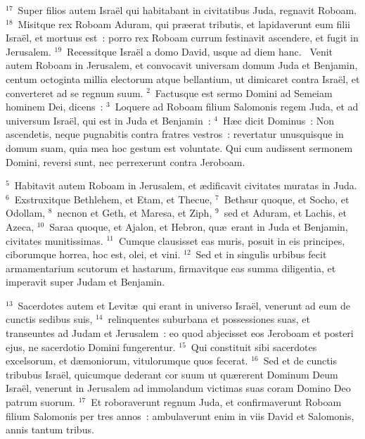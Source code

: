 ${}^{17}$~Super filios autem Isra\"el qui habitabant in civitatibus Juda, regnavit Roboam.
${}^{18}$~Misitque rex Roboam Aduram, qui pr\ae erat tributis, et lapidaverunt eum filii Isra\"el, et mortuus est~: porro rex Roboam currum festinavit ascendere, et fugit in Jerusalem.
${}^{19}$~Recessitque Isra\"el a domo David, usque ad diem hanc.
~\lettrine[lines=10,image=true,loversize=0.05,lraise=-0.03]{V}{}enit autem Roboam in Jerusalem, et convocavit universam domum Juda et Benjamin, centum octoginta millia electorum atque bellantium, ut dimicaret contra Isra\"el, et converteret ad se regnum suum.
${}^{2}$~Factusque est sermo Domini ad Semeiam hominem Dei, dicens~:
${}^{3}$~Loquere ad Roboam filium Salomonis regem Juda, et ad universum Isra\"el, qui est in Juda et Benjamin~:
${}^{4}$~H\ae c dicit Dominus~: Non ascendetis, neque pugnabitis contra fratres vestros~: revertatur unusquisque in domum suam, quia mea hoc gestum est voluntate. Qui cum audissent sermonem Domini, reversi sunt, nec perrexerunt contra Jeroboam.


${}^{5}$~Habitavit autem Roboam in Jerusalem, et \ae dificavit civitates muratas in Juda.
${}^{6}$~Exstruxitque Bethlehem, et Etam, et Thecue,
${}^{7}$~Bethsur quoque, et Socho, et Odollam,
${}^{8}$~necnon et Geth, et Maresa, et Ziph,
${}^{9}$~sed et Aduram, et Lachis, et Azeca,
${}^{10}$~Saraa quoque, et Ajalon, et Hebron, qu\ae\ erant in Juda et Benjamin, civitates munitissimas.
${}^{11}$~Cumque clausisset eas muris, posuit in eis principes, ciborumque horrea, hoc est, olei, et vini.
${}^{12}$~Sed et in singulis urbibus fecit armamentarium scutorum et hastarum, firmavitque eas summa diligentia, et imperavit super Judam et Benjamin.


${}^{13}$~Sacerdotes autem et Levit\ae\ qui erant in universo Isra\"el, venerunt ad eum de cunctis sedibus suis,
${}^{14}$~relinquentes suburbana et possessiones suas, et transeuntes ad Judam et Jerusalem~: eo quod abjecisset eos Jeroboam et posteri ejus, ne sacerdotio Domini fungerentur.
${}^{15}$~Qui constituit sibi sacerdotes excelsorum, et d\ae moniorum, vitulorumque quos fecerat.
${}^{16}$~Sed et de cunctis tribubus Isra\"el, quicumque dederant cor suum ut qu\ae rerent Dominum Deum Isra\"el, venerunt in Jerusalem ad immolandum victimas suas coram Domino Deo patrum suorum.
${}^{17}$~Et roboraverunt regnum Juda, et confirmaverunt Roboam filium Salomonis per tres annos~: ambulaverunt enim in viis David et Salomonis, annis tantum tribus.


